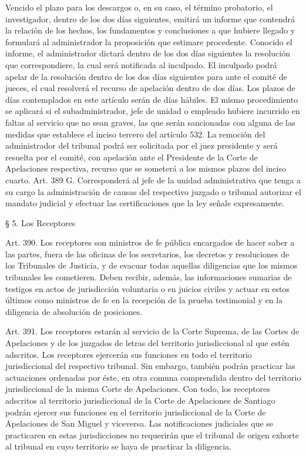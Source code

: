     Vencido el plazo para los descargos o, en su caso, el término probatorio, el investigador, dentro de los dos días siguientes, emitirá un informe que contendrá la relación de los hechos, los fundamentos y conclusiones a que hubiere llegado y formulará al administrador la proposición que estimare procedente. Conocido el informe, el administrador dictará dentro de los dos días siguientes la resolución que correspondiere, la cual será notificada al inculpado.
    El inculpado podrá apelar de la resolución dentro de los dos días siguientes para ante el comité de jueces, el cual resolverá el recurso de apelación dentro de dos días.
    Los plazos de días contemplados en este artículo serán de días hábiles.
    El mismo procedimiento se aplicará si el subadministrador, jefe de unidad o empleado hubiere incurrido en faltas al servicio que no sean graves, las que serán sancionadas con alguna de las medidas que establece el inciso tercero del artículo 532.
    La remoción del administrador del tribunal podrá ser solicitada por el juez presidente y será resuelta por el comité, con apelación ante el Presidente de la Corte de Apelaciones respectiva, recurso que se someterá a los mismos plazos del inciso cuarto.
    Art. 389 G. Corresponderá al jefe de la unidad administrativa que tenga a su cargo la administración de causas del respectivo juzgado o tribunal autorizar el mandato judicial y efectuar las certificaciones que la ley señale expresamente.



    § 5. Los Receptores


    Art. 390. Los receptores son ministros de fe pública encargados de hacer saber a las partes, fuera de las oficinas de los secretarios, los decretos y resoluciones de los Tribunales de Justicia, y de evacuar todas aquellas diligencias que los mismos tribunales les cometieren.
    Deben recibir, además, las informaciones sumarias de testigos en actos de jurisdicción voluntaria o en juicios civiles y actuar en estos últimos como ministros de fe en la recepción de la prueba testimonial y en la diligencia de absolución de posiciones.

    Art. 391. Los receptores estarán al servicio de la Corte Suprema, de las Cortes de Apelaciones y de los juzgados de letras del territorio jurisdiccional al que estén adscritos.
    Los receptores ejercerán sus funciones en todo el territorio jurisdiccional del respectivo tribunal. Sin embargo, también podrán practicar las actuaciones ordenadas por éste, en otra comuna comprendida dentro del territorio jurisdiccional de la misma Corte de Apelaciones. Con todo, los receptores adscritos al territorio jurisdiccional de la Corte de Apelaciones de Santiago podrán ejercer sus funciones en el territorio jurisdiccional de la Corte de Apelaciones de San Miguel y viceversa. Las notificaciones judiciales que se practicaren en estas jurisdicciones no requerirán que el tribunal de origen exhorte al tribunal en cuyo territorio se haya de practicar la diligencia.





